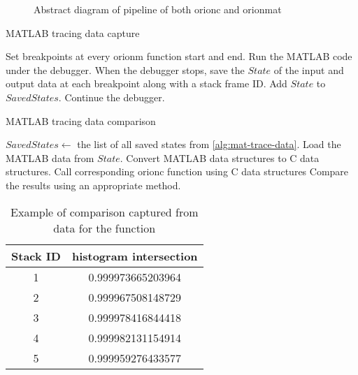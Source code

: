 \begin{sidewaysfigure}
	\centering

	\resizebox{1.0\linewidth}{!}{}
	\caption{Abstract diagram of pipeline of both \gls{orionc}
		and \gls{orionmat}}\label{fig:abs-pipe}
\end{sidewaysfigure}

\begin{algorithm}
	\caption{MATLAB tracing data capture}\label{alg:mat-trace-data}
	\begin{algorithmic}[1]
		\State Set breakpoints at every \gls{orionm} function start and end.
		\State Run the MATLAB code under the debugger.
			\State When the debugger stops, save the $State$ of the input and output data at
				each breakpoint along with a stack frame
				ID. Add $State$ to $SavedStates$.
			\State Continue the debugger.
		\EndWhile
	\end{algorithmic}
\end{algorithm}

\begin{algorithm}
	\caption{MATLAB tracing data comparison}\label{alg:mat-trace-compare}
	\begin{algorithmic}[1]
		\State \Input $SavedStates \gets$ the list of all saved
		states from \cref{alg:mat-trace-data}.
			\State Load the MATLAB data from $State$.
			\State Convert MATLAB data structures to C
			data structures.
			\State Call corresponding \gls{orionc}
				function using C data structures
			\State Compare the results using an
				appropriate method.
		\EndFor
	\end{algorithmic}
\end{algorithm}

\begin{table}
	\centering
	\begin{tabular}{cc}
		\toprule
		\be{}Stack ID     & \be{} histogram intersection \\
		\midrule
		1 & 0.999973665203964 \\
		2 & 0.999967508148729 \\
		3 & 0.999978416844418 \\
		4 & 0.999982131154914 \\
		5 & 0.999959276433577 \\
		\bottomrule
	\end{tabular}
	\caption{Example of comparison captured from data for the
		 function}\label{tbl:compare-Makefilter}
\end{table}


